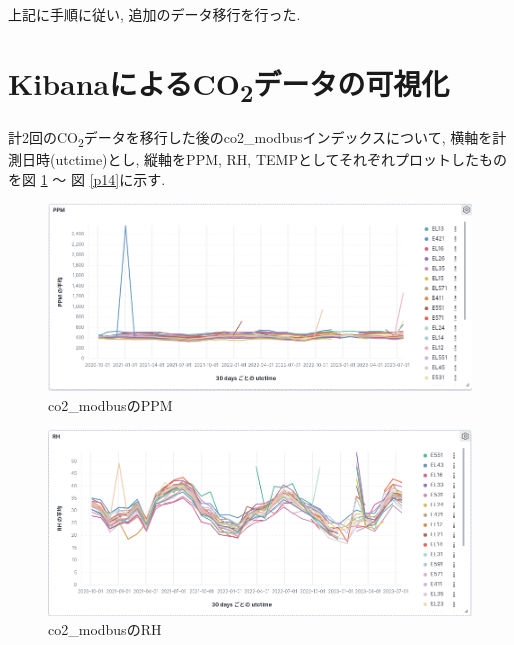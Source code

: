 上記に手順に従い, 追加のデータ移行を行った.

\section{KibanaによるCO\textsubscript{2}データの可視化}

計2回のCO\textsubscript{2}データを移行した後のco2\_modbusインデックスについて, 横軸を計測日時(utctime)とし, 縦軸をPPM, RH, TEMPとしてそれぞれプロットしたものを図 \ref{p12} 〜 図 \ref{p14}に示す.

\begin{figure}[H]
  \begin{center}
    \includegraphics[width=160mm]{sotu/figure/ppm.png}
    \caption{co2\_modbusのPPM}
    \label{p12}
  \end{center}
\end{figure}

\begin{figure}[H]
  \begin{center}
    \includegraphics[width=160mm]{sotu/figure/rh.png}
    \caption{co2\_modbusのRH}
    \label{p13}
  \end{center}
\end{figure}

